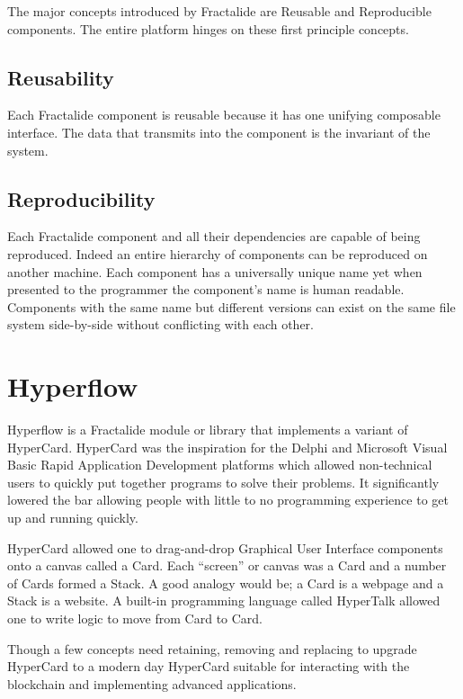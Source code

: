 \documentclass[%
 aip,
 jmp,%
 amsmath,amssymb,
 reprint,%
]{revtex4-1}
\begin{document}
The major concepts introduced by Fractalide are Reusable and Reproducible components. The entire platform hinges on these first principle concepts.

\subsection{\label{sec:level2}Reusability}

Each Fractalide component is reusable because it has one unifying composable interface. The data that transmits into the component is the invariant of the system.

\subsection{\label{sec:level2}Reproducibility}

Each Fractalide component and all their dependencies are capable of being reproduced. Indeed an entire hierarchy of components can be reproduced on another machine. Each component has a universally unique name yet when presented to the programmer the component's name is human readable. Components with the same name but different versions can exist on the same file system side-by-side without conflicting with each other.

\section{\label{sec:level1}Hyperflow}

Hyperflow is a Fractalide module or library that implements a variant of HyperCard. HyperCard was the inspiration for the Delphi and Microsoft Visual Basic Rapid Application Development platforms which allowed non-technical users to quickly put together programs to solve their problems. It significantly lowered the bar allowing people with little to no programming experience to get up and running quickly.

HyperCard allowed one to drag-and-drop Graphical User Interface components onto a canvas called a Card. Each ``screen'' or canvas was a Card and a number of Cards formed a Stack. A good analogy would be; a Card is a webpage and a Stack is a website. A built-in programming language called HyperTalk allowed one to write logic to move from Card to Card.

Though a few concepts need retaining, removing and replacing to upgrade HyperCard to a modern day HyperCard suitable for interacting with the blockchain and implementing advanced applications.
\end{document}
